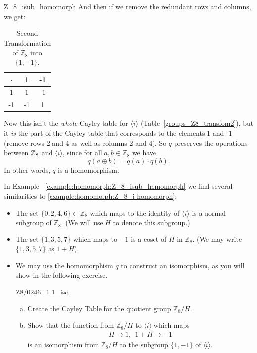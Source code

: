 \begin{example}{Z_8_isub_homomorph}
And then if we remove the redundant rows and columns, we get:

\begin{table}[H]
\caption{\label{1,-1_Z8_transfom2}Second Transformation of ${\mathbb Z}_8$ into $\{1,-1\}$.}{\small
\begin{center}
\begin{tabular}{c|cc}
$\cdot$ & 1 & -1  \\
\hline
1        & 1 & -1  \\
-1       & -1 & 1 \\
\end{tabular}
\end{center}
}
\end{table}

Now this isn't the \emph{whole} Cayley table for $\langle i \rangle$ (Table~\ref{groups_Z8_transfom2}), but it \emph{is} the part of the Cayley table that corresponds to the elements 1 and -1 (remove rows 2 and 4 as well as columns 2 and 4).  So $q$  preserves the operations between $\mathbb{Z}_8$ and $\langle i \rangle$, since for all $a,b \in {\mathbb Z}_8$ we have
\[
q(a \oplus b) = q(a) \cdot q(b).
\]
In other words, $q$ is a homomorphism.
\end{example}

In Example ~\ref{example:homomorph:Z_8_isub_homomorph} we find several similarities to \ref{example:homomorph:Z_8_i homomorph}:

\begin{itemize}
\item
The set $\{0,2,4,6\} \subset {\mathbb Z}_8$ which maps to  the identity of $\langle i \rangle$ is a  normal subgroup of  ${\mathbb Z}_8$. (We will use $H$ to denote this subgroup.)
\item
The set $\{1,3,5,7\}$ which maps to $-1$  is a coset of $H$ in ${\mathbb Z}_8$. (We may write $\{1,3,5,7\}$ as $1+H$).

\item
We may use the homomorphism $q$ to construct an isomorphism, as you will show in the following exercise.

\begin{exercise}{Z8/0246_1-1_iso}
\begin{enumerate}[(a)]
\item
Create the Cayley Table for the quotient group ${\mathbb Z}_8/ H$.
\item
Show that the function from ${\mathbb Z}_8/ H$  to $\langle i \rangle$  which maps
\begin{align*}
   H \longrightarrow 1 ,~~     1+H \longrightarrow -1
\end{align*}
is an isomorphism from ${\mathbb Z}_8/ H$ to the subgroup $\{1,-1\}$ of $ \langle i \rangle$.
\end{enumerate}
\end{exercise}

\end{itemize}


